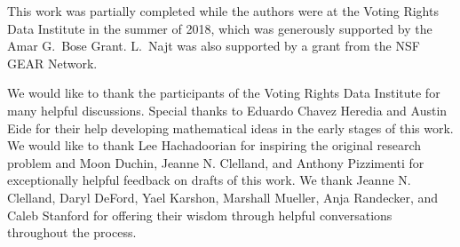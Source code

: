
 This work was partially completed while the authors were at the Voting Rights Data Institute in the summer of 2018, which was generously supported by the Amar G.\ Bose Grant. L.\ Najt was also supported by a grant from the NSF GEAR Network.

We would like to thank the participants of the Voting Rights Data Institute for many helpful discussions. Special thanks to Eduardo Chavez Heredia and Austin Eide for their help developing mathematical ideas in the early stages of this work. We would like to thank Lee Hachadoorian for inspiring the original research problem and Moon Duchin, Jeanne N. Clelland, and Anthony Pizzimenti for exceptionally helpful feedback on drafts of this work.  We thank Jeanne N. Clelland, Daryl DeFord, Yael Karshon, Marshall Mueller, Anja Randecker, and Caleb Stanford for offering their wisdom through helpful conversations throughout the process.